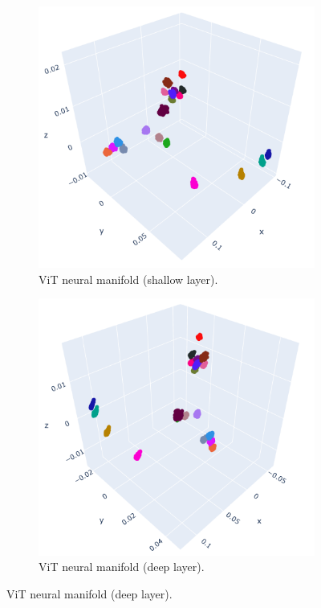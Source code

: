 \begin{figure}[H]
\centering
\begin{subfigure}[b]{0.43\textwidth}
    \includegraphics[width=\textwidth]{figures/embeddings/vit-2d-layer1.png}
    \caption{ViT neural manifold (shallow layer).}
\end{subfigure}
\hfill
\begin{subfigure}[b]{0.4\textwidth}
    \includegraphics[width=\textwidth]{figures/embeddings/vit-2d-layer12.png}
    \caption{ViT neural manifold (deep layer).}
\end{subfigure}
\end{figure}

